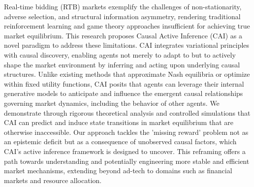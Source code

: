 Real-time bidding (RTB) markets exemplify the challenges of non-stationarity, adverse selection, and structural information asymmetry, rendering traditional reinforcement learning and game theory approaches insufficient for achieving true market equilibrium. This research proposes Causal Active Inference (CAI) as a novel paradigm to address these limitations. CAI integrates variational principles with causal discovery, enabling agents not merely to adapt to but to actively shape the market environment by inferring and acting upon underlying causal structures. Unlike existing methods that approximate Nash equilibria or optimize within fixed utility functions, CAI posits that agents can leverage their internal generative models to anticipate and influence the emergent causal relationships governing market dynamics, including the behavior of other agents. We demonstrate through rigorous theoretical analysis and controlled simulations that CAI can predict and induce state transitions in market equilibrium that are otherwise inaccessible. Our approach tackles the 'missing reward' problem not as an epistemic deficit but as a consequence of unobserved causal factors, which CAI's active inference framework is designed to uncover. This reframing offers a path towards understanding and potentially engineering more stable and efficient market mechanisms, extending beyond ad-tech to domains such as financial markets and resource allocation.